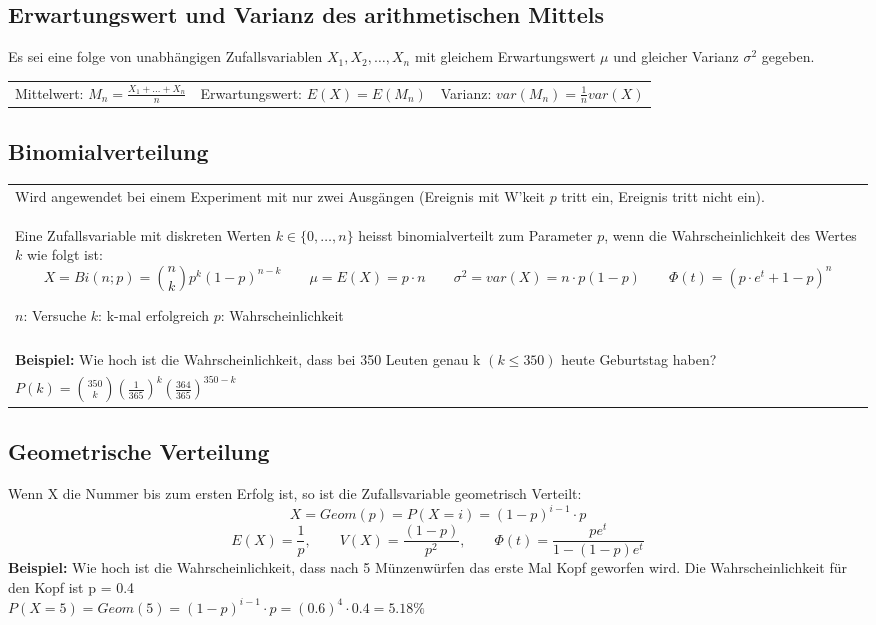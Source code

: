 	
\subsection{Erwartungswert und Varianz des arithmetischen Mittels \skript{}}
	Es sei eine folge von unabhängigen Zufallsvariablen $X_1, X_2, \ldots , X_n$ mit gleichem
	Erwartungswert $ \mu $ und gleicher Varianz $ \sigma^2 $ gegeben.  \\
	\begin{tabular}{p{6cm} p{6cm} p{6cm}}
        Mittelwert: $M_n=\frac{X_1+\ldots+X_n}{n}$ 
        & Erwartungswert: $E(X)=E(M_n)$
        & Varianz: $var(M_n)=\frac{1}{n}var(X)$
    \end{tabular}
\vspace{1mm}

\newpage

\subsection{Binomialverteilung  }
	\begin{tabular}{p{18cm}}
	Wird angewendet bei einem Experiment mit nur zwei Ausgängen (Ereignis mit W'keit $p$ tritt
	ein, Ereignis tritt nicht ein). \\
	Eine Zufallsvariable mit diskreten Werten $k \in \{
	0,\ldots,n \}$ heisst binomialverteilt zum Parameter $p$, wenn die
    Wahrscheinlichkeit des Wertes $k$ wie folgt ist:
	$$X = Bi(n; p) = \binom n k p^k(1-p)^{n-k} \qquad \mu = E(X) = p \cdot n \qquad \sigma^2 =
	var(X) = n \cdot p (1-p) \qquad\Phi(t)=(p\cdot e^t+1-p)^n$$ 
	
	$n$: Versuche \hspace{10mm}
	$k$: k-mal erfolgreich \hspace{10mm}
	$p$: Wahrscheinlichkeit\\\\
	
	{\bf Beispiel:} Wie hoch ist die Wahrscheinlichkeit, dass bei 350 Leuten genau
	k $(k\leq 350)$ heute Geburtstag haben?\\
	$P(k)=\binom {350} k \left(\frac{1}{365}\right)^k
	\left(\frac{364}{365}\right)^{350-k}$
    \end{tabular}
    
 \subsection{Geometrische Verteilung}
 	Wenn X die Nummer bis zum ersten Erfolg ist, so ist die Zufallsvariable geometrisch Verteilt:
 	$$X=Geom(p)=P({X=i})=(1-p)^{i-1} \cdot p$$
 	$$E(X)=\frac{1}{p}, \qquad V(X)=\frac{(1-p)}{p^2}, \qquad \Phi(t)=\frac{pe^t}{1-(1-p)e^t} $$
	{\bf Beispiel:} Wie hoch ist die Wahrscheinlichkeit, dass nach 5 Münzenwürfen das erste Mal Kopf geworfen wird. Die Wahrscheinlichkeit für den Kopf ist p = 0.4\\
	$P(X=5)=Geom(5) = (1-p)^{i-1} \cdot p = (0.6)^4  \cdot 0.4 = 5.18\%$
 	
